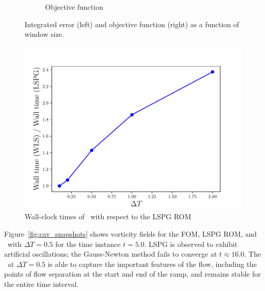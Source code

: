 \begin{figure}
\begin{center}
\begin{subfigure}[t]{0.45\textwidth}
\caption{Objective function} 
\label{fig:cav_results2b}
\end{subfigure}
\end{center}
\caption{Integrated error (left) and objective function (right) as a function of window size.}
\label{fig:cav_results2}
\end{figure}


\begin{figure}
\begin{center}
\includegraphics[trim={0cm 0cm 0cm 0cm},clip,width=0.49\linewidth]{figs/cavity/walltime_vs_window_compare_basis2.pdf}
\caption{Wall-clock times of \methodAcronymROMs\ with respect to the LSPG ROM}
\label{fig:cav_wallclock}
\end{center}
\end{figure}

Figure~\ref{fig:cav_snapshots} shows vorticity fields for the FOM, LSPG ROM, and \methodAcronymROM\ with $\Delta T = 0.5$ for the time instance $t = 5.0$. LSPG is observed to exhibit artificial oscillations; the Gauss-Newton method fails to converge at $t \approx 16.0$. The \methodAcronymROM\ at $\Delta T = 0.5$ is able to capture the important features of the flow, including the points of flow separation at the start and end of the ramp, and remains stable for the entire time interval.  

